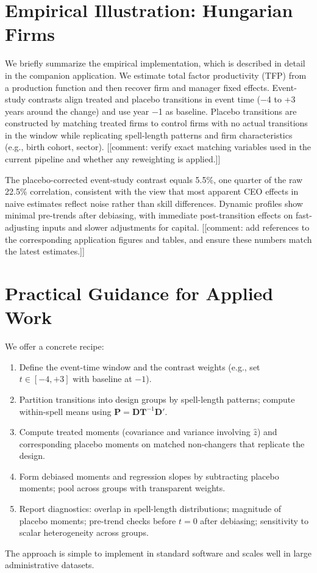 \documentclass[11pt,a4paper]{article}
\begin{document}
\section{Empirical Illustration: Hungarian Firms}

We briefly summarize the empirical implementation, which is described in detail in the companion application. We estimate total factor productivity (TFP) from a production function and then recover firm and manager fixed effects. Event-study contrasts align treated and placebo transitions in event time (−4 to +3 years around the change) and use year −1 as baseline. Placebo transitions are constructed by matching treated firms to control firms with no actual transitions in the window while replicating spell-length patterns and firm characteristics (e.g., birth cohort, sector). [[comment: verify exact matching variables used in the current pipeline and whether any reweighting is applied.]]

The placebo-corrected event-study contrast equals 5.5\%, one quarter of the raw 22.5\% correlation, consistent with the view that most apparent CEO effects in naive estimates reflect noise rather than skill differences. Dynamic profiles show minimal pre-trends after debiasing, with immediate post-transition effects on fast-adjusting inputs and slower adjustments for capital. [[comment: add references to the corresponding application figures and tables, and ensure these numbers match the latest estimates.]]

\section{Practical Guidance for Applied Work}

We offer a concrete recipe:
\begin{enumerate}
 \item Define the event-time window and the contrast weights (e.g., set $t\in[-4,+3]$ with baseline at $-1$).
 \item Partition transitions into design groups by spell-length patterns; compute within-spell means using $\mathbf P=\mathbf D\mathbf T^{-1}\mathbf D'$.
 \item Compute treated moments (covariance and variance involving $\hat z$) and corresponding placebo moments on matched non-changers that replicate the design.
 \item Form debiased moments and regression slopes by subtracting placebo moments; pool across groups with transparent weights.
 \item Report diagnostics: overlap in spell-length distributions; magnitude of placebo moments; pre-trend checks before $t=0$ after debiasing; sensitivity to scalar heterogeneity across groups.
\end{enumerate}
The approach is simple to implement in standard software and scales well in large administrative datasets.
\end{document}
